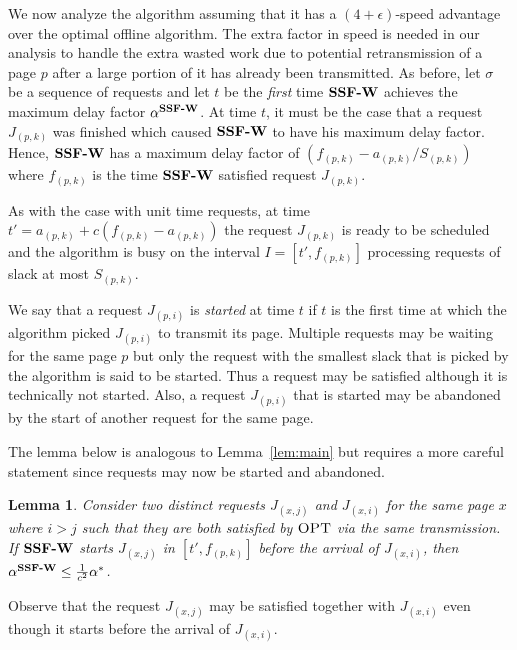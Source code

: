 \documentclass[11pt]{article}
\newtheorem{lemma}{Lemma}[section]
\newcommand{\opt}{\textrm{\sc OPT}}
\newcommand{\eps}{\epsilon}
\newcommand{\st}{S} \newcommand{\Algorithm}[1]{{\texttt{\bf{#1}}}} \newcommand{\sbg}{\Algorithm{SSF-W}} \newcommand{\sug}{\Algorithm{SSF}} \newcommand{\mmug}{\Algorithm{SSF-ID}}
\begin{document}
We now analyze the algorithm assuming that it has a $(4+\eps)$-speed
advantage over the optimal offline algorithm. The extra factor in
speed is needed in our analysis to handle the extra wasted work due to
potential retransmission of a page $p$ after a large portion of it has
already been transmitted.  As before, let $\sigma$ be a sequence of
requests and let $t$ be the \emph{first} time $\sbg$ achieves the
maximum delay factor $\alpha^{\sbg}$.  At time $t$, it must be the
case that a request $J_{(p,k)}$ was finished which caused $\sbg$ to
have his maximum delay factor.  Hence, $\sbg$ has a maximum delay
factor of $(f_{(p,k)} - a_{(p,k)}/ \st_{(p,k)})$ where $f_{(p,k)}$ is
the time $\sbg$ satisfied request $J_{(p,k)}$.

As with the case with unit time requests, at time $t' = a_{(p,k)}
+ c(f_{(p,k)} - a_{(p,k)})$ the request $J_{(p,k)}$ is ready to be
scheduled and the algorithm is busy on the interval $I=[t',
f_{(p,k)}]$ processing requests of slack at most $\st_{(p,k)}$.

We say that a request $J_{(p,i)}$ is {\em started} at time $t$ if $t$
is the first time at which the algorithm picked $J_{(p,i)}$ to
transmit its page. Multiple requests may be waiting for the same page
$p$ but only the request with the smallest slack that is picked by the
algorithm is said to be started. Thus a request may be satisfied
although it is technically not started. Also, a request $J_{(p,i)}$
that is started may be abandoned by the start of another request for
the same page.

The lemma below is analogous to Lemma~\ref{lem:main} but requires
a more careful statement since requests may now be started and
abandoned.

\begin{lemma}
  \label{mainvarying} Consider two distinct requests $J_{(x,j)}$ and
  $J_{(x,i)}$ for the same page $x$ where $i>j$ such that they are
  both satisfied by $\opt$ via the same transmission. If $\sbg$ starts
  $J_{(x,j)}$ in $[t', f_{(p,k)}]$ before the arrival of $J_{(x,i)}$,
  then  $\alpha^{\sbg} \leq {1 \over c^2}\alpha^*$.
\end{lemma}

Observe that the request $J_{(x,j)}$ may be satisfied together with
$J_{(x,i)}$ even though it starts before the arrival of $J_{(x,i)}$.
\end{document}
